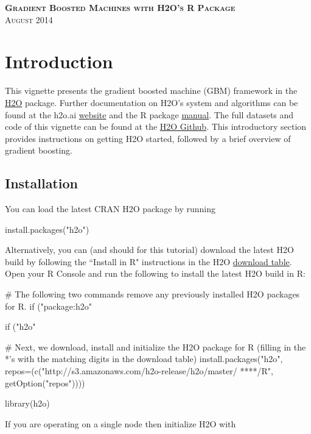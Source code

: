 \documentclass[11pt]{article}
\begin{document}
\thispagestyle{empty} %

\begin{center}
\textsc{\Large\bf{Gradient Boosted Machines with H2O's R Package}}
\\
\bigskip
\textsc{August 2014}
\end{center}
\bigskip
\bigskip
\bigskip
\bigskip
\tableofcontents

\newpage


\section{Introduction} \label{1}

This vignette presents the gradient boosted machine (GBM) framework in the \href{http://cran.r-project.org/web/packages/h2o/index.html}{H2O} package. Further documentation on H2O's system and algorithms can be found at the h2o.ai \href{http://docs.h2o.ai}{website} and the R package \href{http://cran.r-project.org/web/packages/h2o/h2o.pdf}{manual}. The full datasets and code of this vignette can be found at the \href{https://github.com/0xdata/h2o}{H2O Github}. This introductory section provides instructions on getting H2O started, followed by a brief overview of gradient boosting.


\subsection{Installation} \label{1.1}

You can load the latest CRAN H2O package by running

\begin{spverbatim}
install.packages("h2o")
\end{spverbatim}
\bigskip
\noindent
Alternatively, you can (and should for this tutorial) download the latest H2O build by following the ``Install in R" instructions in the H2O \href{http://s3.amazonaws.com/h2o-release/h2o/master/latest.html}{download table}. Open your R Console and run the following to install the latest H2O build in R:

\begin{spverbatim}
# The following two commands remove any previously installed H2O packages for R.
if ("package:h2o" %

if ("h2o" %

# Next, we download, install and initialize the H2O package for R (filling in the *'s with the matching digits in the download table)
install.packages("h2o", repos=(c("http://s3.amazonaws.com/h2o-release/h2o/master/
****/R", getOption("repos"))))

library(h2o)

\end{spverbatim}
\noindent
If you are operating on a single node then initialize H2O with
\end{document}
